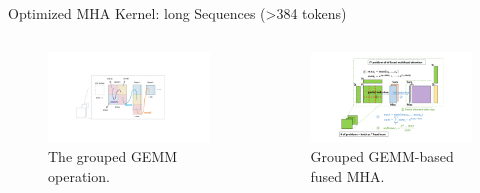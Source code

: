 \begin{frame}{Optimized MHA Kernel: long Sequences (>384 tokens)}
    \begin{columns}[c]
        \begin{column}{.5\textwidth}
        \begin{figure}
            \centering
            \includegraphics[width=1.\textwidth]{./images/grouped-gemm.pdf}
            \caption{The grouped GEMM operation.}
        \end{figure}      
        \end{column}
    
        \begin{column}{.5\textwidth}
            \begin{figure}
                \centering
                \includegraphics[width=1.\textwidth]{./images/grouped-mha.pdf}
                \caption{Grouped GEMM-based fused MHA.}
            \end{figure}  
        \end{column}
    \end{columns}    
\end{frame}